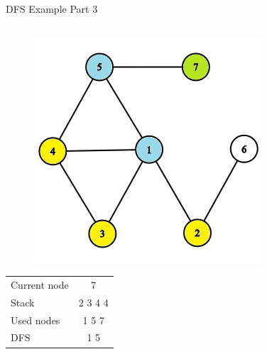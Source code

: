\documentclass[aspectratio=169]{beamer}%
\begin{document}
\begin{frame}{DFS Example Part 3}
    \begin{columns}
        \begin{column}{0.32\textwidth}
            \begin{figure}[!ht]
                \centering
                \includegraphics[width=0.9\linewidth]{dfs 7.png}
            \end{figure}
            \begin{table}[ht]
                \centering
                \begin{tabular}{l c}
                    Current node & 7\\
                    Stack & 2 3 4 4\\ 
                    Used nodes & 1 5 7\\
                    DFS & 1 5
                \end{tabular}
            \end{table}
        \end{column}
        \hfill
        \begin{column}{0.32\textwidth}
            \begin{figure}[!ht]
                \centering

\end{figure}
\end{column}
\end{columns}
\end{frame}
\end{document}
